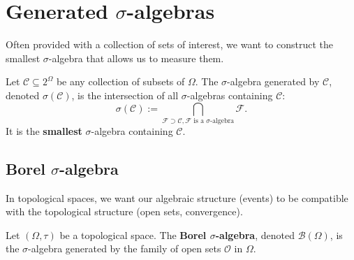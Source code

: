 \section{Generated \texorpdfstring{$\sigma$-}{sigma-}algebras}

Often provided with a collection of sets of interest, we want to construct the smallest \texorpdfstring{$\sigma$-}{sigma-}algebra that allows us to measure them.

\begin{definition}
Let $\mathcal{C} \subseteq 2^{\Omega}$ be any collection of subsets of $\Omega$. The \texorpdfstring{$\sigma$-}{sigma-}algebra generated by $\mathcal{C}$, denoted $\sigma(\mathcal{C})$, is the intersection of all \texorpdfstring{$\sigma$-}{sigma-}algebras containing $\mathcal{C}$:
\[
\sigma(\mathcal{C}) := \bigcap_{\mathcal{F} \supset \mathcal{C}, \mathcal{F} \text{ is a } \sigma\text{-algebra}} \mathcal{F}.
\]
It is the \textbf{smallest} \texorpdfstring{$\sigma$-}{sigma-}algebra containing $\mathcal{C}$.
\end{definition}

\subsection{Borel \texorpdfstring{$\sigma$-}{sigma-}algebra}
In topological spaces, we want our algebraic structure (events) to be compatible with the topological structure (open sets, convergence).

\begin{definition}
Let $(\Omega, \tau)$ be a topological space. The \textbf{Borel \texorpdfstring{$\sigma$-}{sigma-}algebra}, denoted $\mathcal{B}(\Omega)$, is the \texorpdfstring{$\sigma$-}{sigma-}algebra generated by the family of open sets $\mathcal{O}$ in $\Omega$.
\end{definition}

